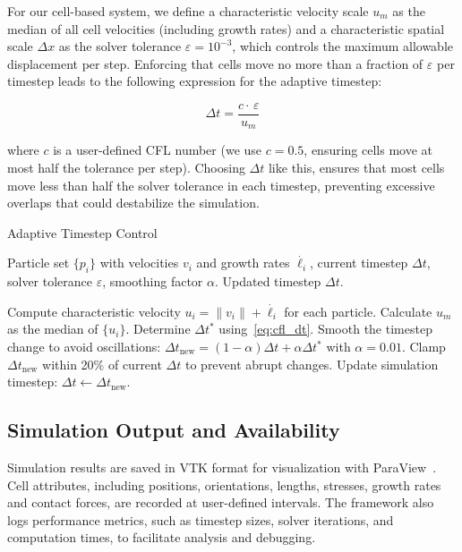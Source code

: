 \documentclass[conference]{IEEEtran}
\begin{document}
For our cell-based system, we define a characteristic velocity scale $u_m$ as the median of all cell velocities (including growth rates) and a characteristic spatial scale $\Delta x$ as the solver tolerance $\varepsilon = 10^{-3}$, which controls the maximum allowable displacement per step. Enforcing that cells move no more than a fraction of $\varepsilon$ per timestep leads to the following expression for the adaptive timestep:

\begin{equation} \label{eq:cfl_dt}
    \Delta t = \frac{c \cdot\, \varepsilon}{u_m}
\end{equation}

where $c$ is a user-defined CFL number (we use $c = 0.5$, ensuring cells move at most half the tolerance per step). Choosing $\Delta t$ like this, ensures that most cells move less than half the solver tolerance in each timestep, preventing excessive overlaps that could destabilize the simulation.

\begin{algorithm}[H]
    \caption{Adaptive Timestep Control}
    \label{alg:adaptive_dt}
    \begin{algorithmic}[1]
        \Require Particle set $\{p_i\}$ with velocities $v_i$ and growth rates $\dot{\ell_i}$, current timestep $\Delta t$, solver tolerance $\varepsilon$, smoothing factor $\alpha$.
        \Ensure Updated timestep $\Delta t$.

        \State Compute characteristic velocity $u_i = \|v_i\| + \dot{\ell_i}$ for each particle.
        \State Calculate $u_m$ as the median of $\{u_i\}$.
        \State Determine $\Delta t^*$ using~\autoref{eq:cfl_dt}.
        \State Smooth the timestep change to avoid oscillations: $\Delta t_{\text{new}} = (1 - \alpha)\Delta t + \alpha \Delta t^*$ with $\alpha = 0.01$.
        \State Clamp $\Delta t_{\text{new}}$ within 20\% of current $\Delta t$ to prevent abrupt changes.
        \State Update simulation timestep: $\Delta t \gets \Delta t_{\text{new}}$.
    \end{algorithmic}
\end{algorithm}

\subsection{Simulation Output and Availability}

Simulation results are saved in VTK format for visualization with ParaView~\cite{ahrens2005paraview}. Cell attributes, including positions, orientations, lengths, stresses, growth rates and contact forces, are recorded at user-defined intervals. The framework also logs performance metrics, such as timestep sizes, solver iterations, and computation times, to facilitate analysis and debugging.
\end{document}
